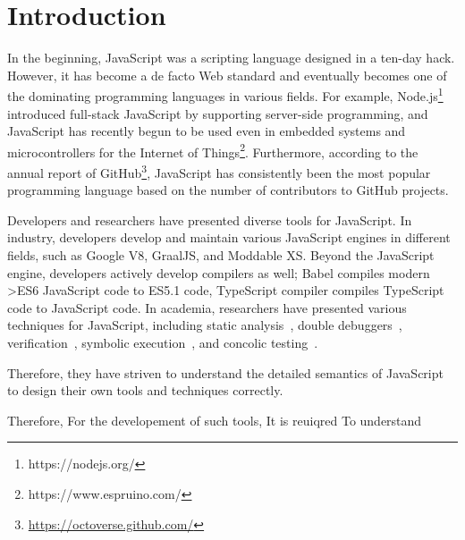 \section{Introduction}\label{sec:intro}

In the beginning, JavaScript was a scripting language designed in a ten-day
hack. However, it has become a de facto Web standard and eventually becomes one
of the dominating programming languages in various fields. For example,
Node.js\footnote{https://nodejs.org/} introduced full-stack JavaScript by
supporting server-side programming, and JavaScript has recently begun to be used
even in embedded systems and microcontrollers for the Internet of
Things\footnote{https://www.espruino.com/}. Furthermore, according to the annual
report of GitHub\footnote{\url{https://octoverse.github.com/}}, JavaScript has
consistently been the most popular programming language based on the number of
contributors to GitHub projects.

Developers and researchers have presented diverse tools for JavaScript.  In
industry, developers develop and maintain various JavaScript engines in
different fields, such as Google V8\cite{v8}, GraalJS\cite{graaljs}, and
Moddable XS\cite{xs}.  Beyond the JavaScript engine, developers actively develop
compilers as well; Babel\cite{babel} compiles modern >ES6 JavaScript code to
ES5.1 code, TypeScript compiler compiles TypeScript code to JavaScript code.  In
academia, researchers have presented various techniques for JavaScript,
including static analysis~\cite{safe, safe2, tajs, wala, jsai}, double
debuggers~\cite{jsexplain}, verification~\cite{javert, javert2, ad-safety,
javanni}, symbolic execution~\cite{symbolic-js, sym-js, expo-se}, and concolic
testing~\cite{jalangi, type-conc-test}.

Therefore, they have striven to understand the detailed semantics of JavaScript
to design their own tools and techniques correctly.

Therefore, 
For the developement of such tools, It is reuiqred 
To understand 

